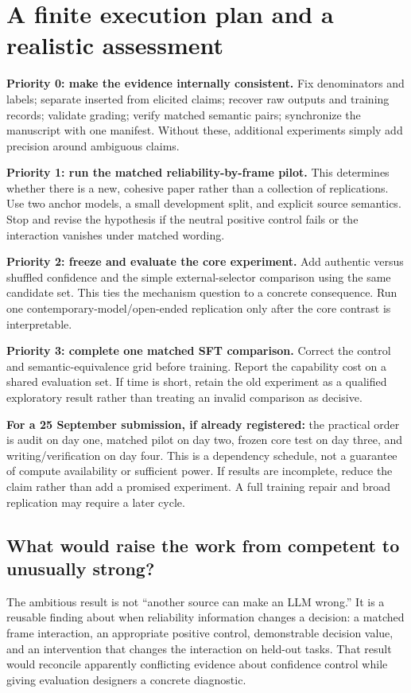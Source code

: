 \documentclass[11pt]{article}
\begin{document}
\section{A finite execution plan and a realistic assessment}

\textbf{Priority 0: make the evidence internally consistent.} Fix denominators and labels; separate inserted from elicited claims; recover raw outputs and training records; validate grading; verify matched semantic pairs; synchronize the manuscript with one manifest. Without these, additional experiments simply add precision around ambiguous claims.

\textbf{Priority 1: run the matched reliability-by-frame pilot.} This determines whether there is a new, cohesive paper rather than a collection of replications. Use two anchor models, a small development split, and explicit source semantics. Stop and revise the hypothesis if the neutral positive control fails or the interaction vanishes under matched wording.

\textbf{Priority 2: freeze and evaluate the core experiment.} Add authentic versus shuffled confidence and the simple external-selector comparison using the same candidate set. This ties the mechanism question to a concrete consequence. Run one contemporary-model/open-ended replication only after the core contrast is interpretable.

\textbf{Priority 3: complete one matched SFT comparison.} Correct the control and semantic-equivalence grid before training. Report the capability cost on a shared evaluation set. If time is short, retain the old experiment as a qualified exploratory result rather than treating an invalid comparison as decisive.

\textbf{For a 25 September submission, if already registered:} the practical order is audit on day one, matched pilot on day two, frozen core test on day three, and writing/verification on day four. This is a dependency schedule, not a guarantee of compute availability or sufficient power. If results are incomplete, reduce the claim rather than add a promised experiment. A full training repair and broad replication may require a later cycle.

\subsection{What would raise the work from competent to unusually strong?}
The ambitious result is not ``another source can make an LLM wrong.'' It is a reusable finding about when reliability information changes a decision: a matched frame interaction, an appropriate positive control, demonstrable decision value, and an intervention that changes the interaction on held-out tasks. That result would reconcile apparently conflicting evidence about confidence control while giving evaluation designers a concrete diagnostic.
\end{document}
